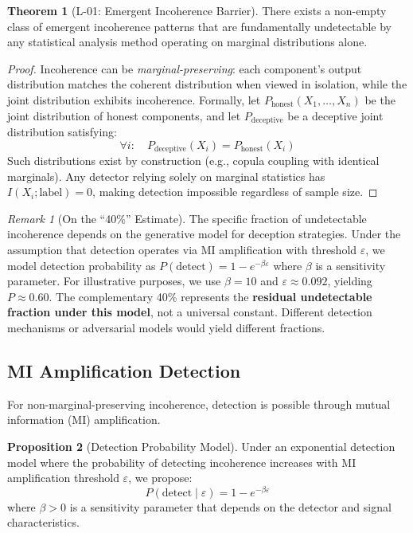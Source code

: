 \documentclass[11pt,a4paper]{article}
\theoremstyle{definition}
\newtheorem{theorem}{Theorem}[section]
\newtheorem{proposition}[theorem]{Proposition}
\theoremstyle{remark}
\newtheorem{remark}{Remark}[section]
\begin{document}
\begin{theorem}[L-01: Emergent Incoherence Barrier]
There exists a non-empty class of emergent incoherence patterns that are fundamentally undetectable by any statistical analysis method operating on marginal distributions alone.
\end{theorem}

\begin{proof}
Incoherence can be \textit{marginal-preserving}: each component's output distribution matches the coherent distribution when viewed in isolation, while the joint distribution exhibits incoherence. Formally, let $P_{\text{honest}}(X_1, \ldots, X_n)$ be the joint distribution of honest components, and let $P_{\text{deceptive}}$ be a deceptive joint distribution satisfying:
\begin{equation}
\forall i: \quad P_{\text{deceptive}}(X_i) = P_{\text{honest}}(X_i)
\end{equation}
Such distributions exist by construction (e.g., copula coupling with identical marginals). Any detector relying solely on marginal statistics has $I(X_i; \text{label}) = 0$, making detection impossible regardless of sample size.
\end{proof}

\begin{remark}[On the ``40\%'' Estimate]
The specific fraction of undetectable incoherence depends on the generative model for deception strategies. Under the assumption that detection operates via MI amplification with threshold $\varepsilon$, we model detection probability as $P(\text{detect}) = 1 - e^{-\beta\varepsilon}$ where $\beta$ is a sensitivity parameter. For illustrative purposes, we use $\beta = 10$ and $\varepsilon \approx 0.092$, yielding $P \approx 0.60$. The complementary 40\% represents the \textbf{residual undetectable fraction under this model}, not a universal constant. Different detection mechanisms or adversarial models would yield different fractions.
\end{remark}

\subsection{MI Amplification Detection}

For non-marginal-preserving incoherence, detection is possible through mutual information (MI) amplification.

\begin{proposition}[Detection Probability Model]
Under an exponential detection model where the probability of detecting incoherence increases with MI amplification threshold $\varepsilon$, we propose:
\begin{equation}
P(\text{detect} \mid \varepsilon) = 1 - e^{-\beta\varepsilon}
\label{eq:detection}
\end{equation}
where $\beta > 0$ is a sensitivity parameter that depends on the detector and signal characteristics.
\end{proposition}
\end{document}
